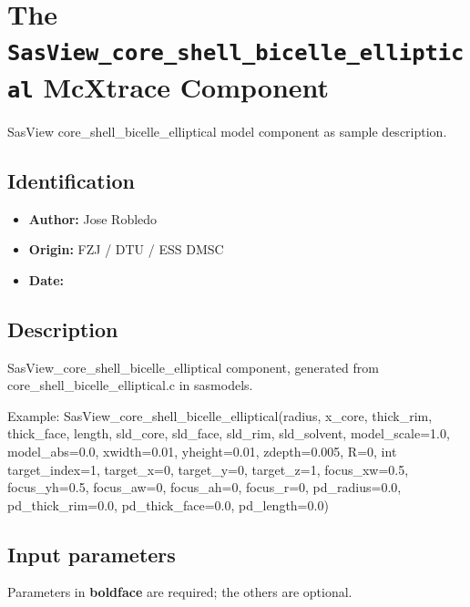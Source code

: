 \section{The \texttt{SasView\_core\_shell\_bicelle\_elliptical} McXtrace Component}
SasView core\_shell\_bicelle\_elliptical model component as sample description.

\subsection*{Identification}
\begin{itemize}
  \item \textbf{Author:} Jose Robledo
  \item \textbf{Origin:} FZJ / DTU / ESS DMSC
  \item \textbf{Date:} 
\end{itemize}

\subsection*{Description}
SasView\_core\_shell\_bicelle\_elliptical component, generated from core\_shell\_bicelle\_elliptical.c in sasmodels.

Example: SasView\_core\_shell\_bicelle\_elliptical(radius, x\_core, thick\_rim, thick\_face, length, sld\_core, sld\_face, sld\_rim, sld\_solvent, model\_scale=1.0, model\_abs=0.0, xwidth=0.01, yheight=0.01, zdepth=0.005, R=0, int target\_index=1, target\_x=0, target\_y=0, target\_z=1, focus\_xw=0.5, focus\_yh=0.5, focus\_aw=0, focus\_ah=0, focus\_r=0, pd\_radius=0.0, pd\_thick\_rim=0.0, pd\_thick\_face=0.0, pd\_length=0.0)

\subsection*{Input parameters}
Parameters in \textbf{boldface} are required; the others are optional.

